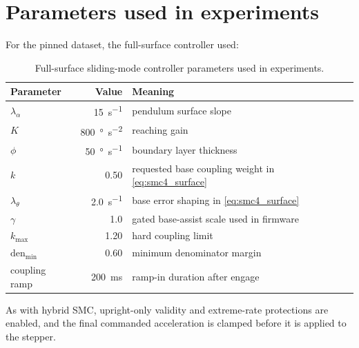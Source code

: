\section{Parameters used in experiments}
For the pinned dataset, the full-surface controller used:
\begin{table}[htbp]
  \centering
  \small
  \setlength{\tabcolsep}{5pt}
  \caption{Full-surface sliding-mode controller parameters used in experiments.}
  \label{tab:smc4_params}
  \begin{tabular}{lrl}
    \toprule
    Parameter & Value & Meaning \\
    \midrule
    $\lambda_{\alpha}$ & 15\ \si{s^{-1}} & pendulum surface slope \\
    $K$ & 800\ \si{\degree\per\second\squared} & reaching gain \\
    $\phi$ & 50\ \si{\degree\per\second} & boundary layer thickness \\
    $k$ & 0.50 & requested base coupling weight in \eqref{eq:smc4_surface} \\
    $\lambda_{\theta}$ & 2.0\ \si{s^{-1}} & base error shaping in \eqref{eq:smc4_surface} \\
    $\gamma$ & 1.0 & gated base-assist scale used in firmware \\
    \midrule
    $k_{\max}$ & 1.20 & hard coupling limit \\
    $\mathrm{den}_{\min}$ & 0.60 & minimum denominator margin \\
    coupling ramp & \SI{200}{ms} & ramp-in duration after engage \\
    \bottomrule
  \end{tabular}
\end{table}
As with hybrid SMC, upright-only validity and extreme-rate protections are enabled, and the final commanded acceleration is clamped before it is applied to the stepper.

